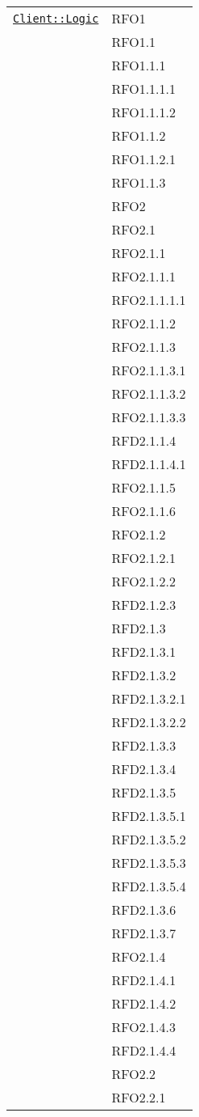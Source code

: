 \begin{longtable}{|>{\centering}m{10cm}|m{3cm}<{\centering}|}
\hyperref[Client::Logic]{\texttt{Client::Logic}} & RFO1\\
& RFO1.1\\
& RFO1.1.1\\
& RFO1.1.1.1\\
& RFO1.1.1.2\\
& RFO1.1.2\\
& RFO1.1.2.1\\
& RFO1.1.3\\
& RFO2\\
& RFO2.1\\
& RFO2.1.1\\
& RFO2.1.1.1\\
& RFO2.1.1.1.1\\
& RFO2.1.1.2\\
& RFO2.1.1.3\\
& RFO2.1.1.3.1\\
& RFO2.1.1.3.2\\
& RFO2.1.1.3.3\\
& RFD2.1.1.4\\
& RFD2.1.1.4.1\\
& RFO2.1.1.5\\
& RFO2.1.1.6\\
& RFO2.1.2\\
& RFO2.1.2.1\\
& RFO2.1.2.2\\
& RFD2.1.2.3\\
& RFD2.1.3\\
& RFD2.1.3.1\\
& RFD2.1.3.2\\
& RFD2.1.3.2.1\\
& RFD2.1.3.2.2\\
& RFD2.1.3.3\\
& RFD2.1.3.4\\
& RFD2.1.3.5\\
& RFD2.1.3.5.1\\
& RFD2.1.3.5.2\\
& RFD2.1.3.5.3\\
& RFD2.1.3.5.4\\
& RFD2.1.3.6\\
& RFD2.1.3.7\\
& RFO2.1.4\\
& RFD2.1.4.1\\
& RFD2.1.4.2\\
& RFO2.1.4.3\\
& RFD2.1.4.4\\
& RFO2.2\\
& RFO2.2.1\\

\end{longtable}
